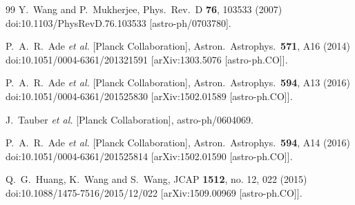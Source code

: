 \documentclass[floatfix,aps,amsmath,nofootinbib,onecolumn,10pt]{revtex4}
\begin{document}
\begin{thebibliography}{99}
  Y.~Wang and P.~Mukherjee,
  Phys.\ Rev.\ D {\bf 76}, 103533 (2007)
  doi:10.1103/PhysRevD.76.103533
  [astro-ph/0703780].
  
  P.~A.~R.~Ade {\it et al.} [Planck Collaboration],
  Astron.\ Astrophys.\  {\bf 571}, A16 (2014)
  doi:10.1051/0004-6361/201321591
  [arXiv:1303.5076 [astro-ph.CO]].
  
  P.~A.~R.~Ade {\it et al.} [Planck Collaboration],
  Astron.\ Astrophys.\  {\bf 594}, A13 (2016)
  doi:10.1051/0004-6361/201525830
  [arXiv:1502.01589 [astro-ph.CO]].

  J.~Tauber {\it et al.} [Planck Collaboration],
  astro-ph/0604069.

  P.~A.~R.~Ade {\it et al.} [Planck Collaboration],
  Astron.\ Astrophys.\  {\bf 594}, A14 (2016)
  doi:10.1051/0004-6361/201525814
  [arXiv:1502.01590 [astro-ph.CO]].


  Q.~G.~Huang, K.~Wang and S.~Wang,
  JCAP {\bf 1512}, no. 12, 022 (2015)
  doi:10.1088/1475-7516/2015/12/022
  [arXiv:1509.00969 [astro-ph.CO]].






  
  
  
  
  
  
  
  

\end{thebibliography}
\end{document}

